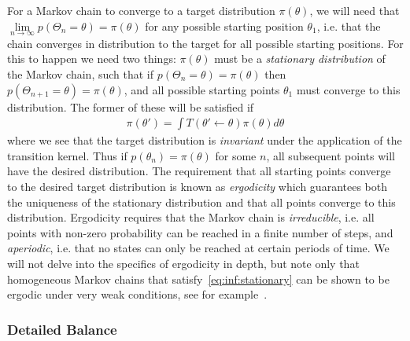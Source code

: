 For a Markov chain to converge to a target distribution $\pi (\theta)$, we will need that
$\lim\limits_{n\rightarrow\infty} p(\Theta_n=\theta) = \pi(\theta)$ for any possible starting position $\theta_1$, i.e.
that the chain converges in distribution to the target for all possible starting positions.   For this
to happen we need two things: $\pi(\theta)$ must be a \emph{stationary distribution} of the Markov
chain, such that if $p(\Theta_n=\theta) = \pi(\theta)$ then $p(\Theta_{n+1}=\theta) = \pi(\theta)$, and all possible starting points
$\theta_1$ must converge to this distribution.  
The former of these will be satisfied if 
\begin{align}
\label{eq:inf:stationary}
\pi(\theta') = \int T(\theta' \leftarrow \theta) \pi(\theta)d\theta
\end{align}
where we see that the target distribution is \emph{invariant} under the application of the transition kernel.
Thus if $p(\theta_n)=\pi(\theta)$ for some $n$, all subsequent points will have the desired distribution.
The requirement that all starting points converge to the desired target distribution is known
as \emph{ergodicity} which guarantees both the uniqueness of the stationary distribution
and that all points converge to this distribution.  Ergodicity requires that the Markov chain is
\emph{irreducible}, i.e. all points with non-zero probability can be reached in a finite number
of steps, and \emph{aperiodic}, i.e. that no states can only be reached at certain periods of 
time.   We will not delve into the specifics of ergodicity in depth, but note only that homogeneous
Markov chains that satisfy~\eqref{eq:inf:stationary} can be shown to be ergodic under very weak
conditions, see for example~\cite{neal1993probabilistic,tierney1994markov}.

\subsubsection{Detailed Balance}
\label{sec:inf:foundation:mcmc:db}

